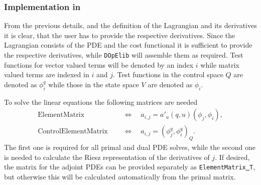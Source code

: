 \subsubsection{Implementation in \dope{}}
{
From the previous details, and the definition of the Lagrangian and its 
derivatives it is clear, that the user has to provide the respective derivatives. 
Since the Lagrangian consists of the PDE and the cost functional it 
is sufficient to provide the respective derivatives, while \texttt{DOpElib} 
will assemble them as required.
Test functions for vector valued terms will be denoted by an index $i$ while 
matrix valued terms are indexed in $i$ and $j$. Test functions in the control 
space $Q$ are denoted as $\phi^q_i$ while those in the state space $V$ are denoted 
as $\phi_i$.

To solve the linear equations the following matrices are needed
\begin{align*}
\text{ElementMatrix} \quad 
&\Leftrightarrow \quad a_{i,j} = a'_u(q,u)(\phi_j,\phi_i), \\
\text{ControlElementMatrix } \quad 
&\Leftrightarrow \quad a_{i,j} = (\phi^q_j, \phi^q_i)_Q.
\end{align*}
The first one is required for all primal and dual PDE solves, while the second one is needed 
to calculate the Riesz representation of the derivatives of $j$. 
If desired, the matrix for the adjoint PDEs can be provided separately as 
\texttt{ElementMatrix\underline{ }T}, but otherwise this will be 
calculated automatically from the primal matrix.

}
